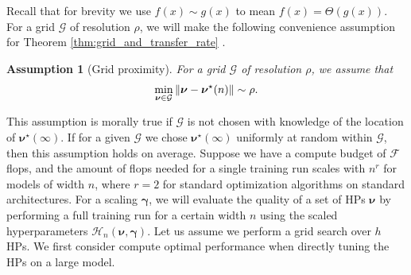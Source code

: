 \documentclass{article} %
\newtheorem{assumption}{Assumption}
\newcommand{\bhp}{\bm{\nu}}                       %
\newcommand{\bhpexp}{\bm{\gamma}}                 %
\newcommand{\scaledhps}{\mathcal{H}}
\newcommand{\grid}{\mathcal{G}}                   %
\newcommand{\compexp}{r}
\newcommand{\gridres}{\rho}                       %
\newcommand{\growthexp}{\kappa}
\newcommand{\numhps}{h}
\newcommand{\flops}{\mathcal{F}}
\begin{document}
Recall that for brevity we use $f(x) \sim g(x)$ to mean $f(x) = \Theta(g(x))$. For a grid $\grid$ of resolution $\gridres$, we will make the following convenience assumption for Theorem \ref{thm:grid_and_transfer_rate} .
\begin{assumption}[Grid proximity]\label{assump:grid_proximity}
For a grid $\grid$ of resolution $\gridres$, we assume that
\[
    \min_{\bhp \in \grid} \norm{\bhp - \bhp^\star(n)} \sim \gridres.
\]
\end{assumption}
This assumption is morally true if $\grid$ is not chosen with knowledge of the location of $\bhp^\star(\infty)$. If for a given $\grid$ we chose $\bhp^\star(\infty)$ uniformly at random within $\grid$, then this assumption holds on average. 
Suppose we have a compute budget of $\flops$ flops, and the amount of flops needed for a single training run scales with $n^{\compexp}$ for models of width $n$, where $\compexp = 2$ for standard optimization algorithms on standard architectures. For a scaling $\bhpexp$, we will evaluate the quality of a set of HPs $\bhp$ by performing a full training run for a certain width $n$ using the scaled hyperparameters $\scaledhps_n(\bhp, \bhpexp)$. Let us assume we perform a grid search over $\numhps$ HPs. We first consider compute optimal performance when directly tuning the HPs on a large model. 
\end{document}
